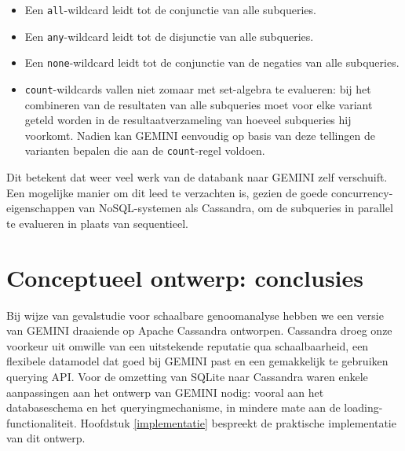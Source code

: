 \begin{itemize}
\item Een \texttt{all}-wildcard leidt tot de conjunctie van alle subqueries.
\item Een \texttt{any}-wildcard leidt tot de disjunctie van alle subqueries.
\item Een \texttt{none}-wildcard leidt tot de conjunctie van de negaties van alle subqueries.
\item \texttt{count}-wildcards vallen niet zomaar met set-algebra te evalueren: bij het combineren van de resultaten van alle subqueries moet voor elke variant geteld worden in de resultaatverzameling van hoeveel subqueries hij voorkomt. Nadien kan GEMINI eenvoudig op basis van deze tellingen de varianten bepalen die aan de \texttt{count}-regel voldoen.
\end{itemize}

Dit betekent dat weer veel werk van de databank naar GEMINI zelf verschuift. Een mogelijke manier om dit leed te verzachten is, gezien de goede concurrency-eigenschappen van NoSQL-systemen als Cassandra, om de subqueries in parallel te evalueren in plaats van sequentieel.

\section{Conceptueel ontwerp: conclusies}

Bij wijze van gevalstudie voor schaalbare genoomanalyse hebben we een versie van GEMINI draaiende op Apache Cassandra ontworpen. Cassandra droeg onze voorkeur uit omwille van een uitstekende reputatie qua schaalbaarheid, een flexibele datamodel dat goed bij GEMINI past en een gemakkelijk te gebruiken querying API. Voor de omzetting van SQLite naar Cassandra waren enkele aanpassingen aan het ontwerp van GEMINI nodig: vooral aan het databaseschema en het queryingmechanisme, in mindere mate aan de loading-functionaliteit. Hoofdstuk \ref{implementatie} bespreekt de praktische implementatie van dit ontwerp.